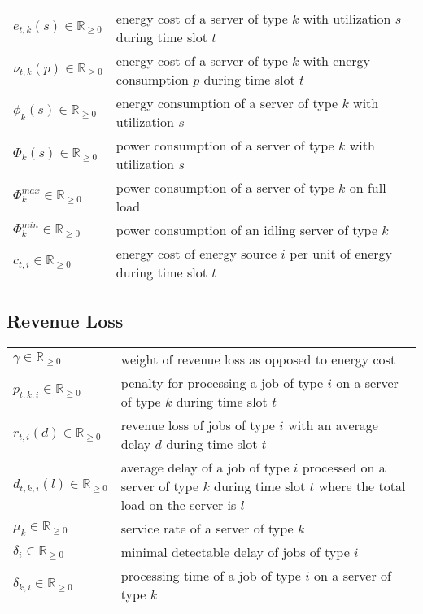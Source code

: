 \begin{tabularx}{\textwidth}{lX}
    $e_{t,k}(s) \in \mathbb{R}_{\geq 0}$ & energy cost of a server of type $k$ with utilization $s$ during time slot $t$ \\
    $\nu_{t,k}(p) \in \mathbb{R}_{\geq 0}$ & energy cost of a server of type $k$ with energy consumption $p$ during time slot $t$ \\
    $\phi_k(s) \in \mathbb{R}_{\geq 0}$ & energy consumption of a server of type $k$ with utilization $s$ \\
    $\Phi_k(s) \in \mathbb{R}_{\geq 0}$ & power consumption of a server of type $k$ with utilization $s$ \\
    $\Phi_k^{max} \in \mathbb{R}_{\geq 0}$ & power consumption of a server of type $k$ on full load \\
    $\Phi_k^{min} \in \mathbb{R}_{\geq 0}$ & power consumption of an idling server of type $k$ \\
    $c_{t,i} \in \mathbb{R}_{\geq 0}$ & energy cost of energy source $i$ per unit of energy during time slot $t$ \\
\end{tabularx}

\vspace{\fill}

\subsection*{Revenue Loss}

\begin{tabularx}{\textwidth}{lX}
    $\gamma \in \mathbb{R}_{\geq 0}$ & weight of revenue loss as opposed to energy cost \\
    $p_{t,k,i} \in \mathbb{R}_{\geq 0}$ & penalty for processing a job of type $i$ on a server of type $k$ during time slot $t$ \\
    $r_{t,i}(d) \in \mathbb{R}_{\geq 0}$ & revenue loss of jobs of type $i$ with an average delay $d$ during time slot $t$ \\
    $d_{t,k,i}(l) \in \mathbb{R}_{\geq 0}$ & average delay of a job of type $i$ processed on a server of type $k$ during time slot $t$ where the total load on the server is $l$ \\
    $\mu_k \in \mathbb{R}_{\geq 0}$ & service rate of a server of type $k$ \\
    $\delta_i \in \mathbb{R}_{\geq 0}$ & minimal detectable delay of jobs of type $i$ \\
    $\delta_{k,i} \in \mathbb{R}_{\geq 0}$ & processing time of a job of type $i$ on a server of type $k$ \\
\end{tabularx}

